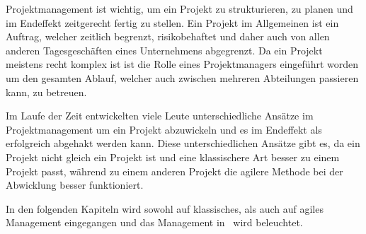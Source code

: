 
Projektmanagement ist wichtig, um ein Projekt zu strukturieren, zu planen und im Endeffekt zeitgerecht fertig zu stellen. Ein Projekt im Allgemeinen ist ein Auftrag, welcher zeitlich begrenzt, risikobehaftet und daher auch von allen anderen Tagesgeschäften eines Unternehmens abgegrenzt. Da ein Projekt meistens recht komplex ist ist die Rolle eines Projektmanagers eingeführt worden um den gesamten Ablauf, welcher auch zwischen mehreren Abteilungen passieren kann, zu betreuen. \cite{Projectman.}

Im Laufe der Zeit entwickelten viele Leute unterschiedliche Ansätze im Projektmanagement um ein Projekt abzuwickeln und es im Endeffekt als erfolgreich abgehakt werden kann. Diese unterschiedlichen Ansätze gibt es, da ein Projekt nicht gleich ein Projekt ist und eine klassischere Art besser zu einem Projekt passt, während zu einem anderen Projekt die agilere Methode bei der Abwicklung besser funktioniert. \cite{Projectman.}

In den folgenden Kapiteln wird sowohl auf klassisches, als auch auf agiles Management eingegangen und das Management in \ZELIA\ wird beleuchtet. \cite{Projectman.}


